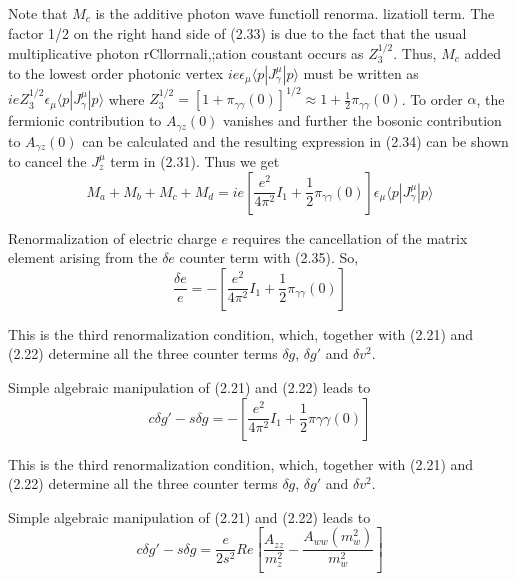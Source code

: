 {Note that $M_{c}$ is the additive photon wave functioll renorma. lizatioll term. The
factor 1/2 on the right hand side of (2.33) is due to the fact that the usual multiplicative photon rCllorrnali,;ation coustant occurs as $Z_{3}^{1/2}$. Thus, $M_{c}$ added to
the lowest order photonic vertex $ie \epsilon_{\mu} \langle p| J_{\gamma}^{\mu} | p \rangle$ must be written as $ieZ_{3}^{1/2} \epsilon_{\mu}\langle p| J_{\gamma}^{\mu} |p\rangle$ where $Z_{3}^{1/2}= [1 + \pi_{\gamma \gamma} (0)]^{1/2} \approx 1 + \frac{1}{2} \pi_{\gamma \gamma}(0)$. To order $\alpha$, the fermionic contribution to $A_{\gamma z}(0)$ vanishes and further the bosonic contribution to $A_{\gamma z}(0)$ can be calculated and the resulting expression in (2.34) can be shown to cancel the $J_{z}^{\mu}$ term in (2.31). Thus we get 
\begin{equation*}
M_{a} +M_{b} + M_{c} + M_{d} = ie \left[ \frac{e^{2}}{4\pi^{2}} I _{1} + \frac{1}{2} \pi_{\gamma \gamma}(0) \right] \epsilon_{\mu} \langle p | J_{\gamma}^{\mu} | p \rangle \tag{2.35}
\end{equation*}

Renormalization of electric charge $e$ requires the cancellation of the matrix
element arising from the $\delta e$ counter term with (2.35). So, 
\begin{equation*}
\frac{\delta e}{e} =  - \left[\frac{e^{2}}{4 \pi^{2}}I_{1} + \frac{1}{2}\pi_{\gamma\gamma}(0) \right]\tag{2.36}
\end{equation*}

This is the third renormalization condition, which, together with (2.21) and
(2.22) determine all the three counter terms $\delta g$, $\delta g'$ and $\delta v^{2}$.

Simple algebraic manipulation of (2.21) and (2.22) leads to
\begin{equation*}
c\delta g'- s\delta g = -[\frac{e^{2}}{4\pi^{2}}I_{1} + \frac{1}{2}\pi{\gamma \gamma}(0)]\tag{2.36}
\end{equation*}

This is the third renormalization condition, which, together with (2.21) and
(2.22) determine all the three counter terms $\delta g$, $\delta g'$ and $\delta v^{2}$.

Simple algebraic manipulation of (2.21) and (2.22) leads to  
\begin{equation*}
c \delta g' - s \delta g = \frac{e}{2s^{2}} Re \left[\frac{A_{zz}}{m^{2}_{z}} - \frac{A_{ww}(m^{2}_{w})}{m^{2}_{w}} \right]\tag{2.37}
\end{equation*}

}
